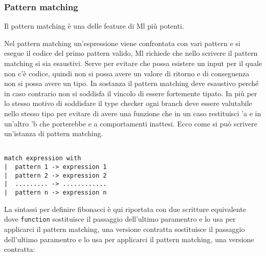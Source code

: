 \documentclass{article}
\begin{document}
\subsubsection{Pattern matching}

\hspace*{0.5cm}Il pattern matching è una delle feature di Ml più potenti.

Nel pattern matching un'espressione viene confrontata con vari pattern e si esegue il codice del primo pattern valido, Ml richiede che nello scrivere il pattern matching si sia esaustivi.
Serve per evitare che possa esistere un input per il quale non c'è codice, quindi non si possa avere un valore di ritorno e di conseguenza non si possa avere un tipo. 
In sostanza il pattern matching deve esaustivo perché in caso contrario non si soddisfa il vincolo di essere fortemente tipato.
In più per lo stesso motivo di soddisfare il type checker ogni branch deve essere valutabile nello stesso tipo per evitare di avere una funzione che in un caso restituisci 'a e in un'altro 'b che porterebbe e a comportamenti inattesi.
Ecco come si può scrivere un'istanza di pattern matching.

\begin{verbatim}

match expression with
|  pattern 1 -> expression 1
|  pattern 2 -> expression 2
|  ......... -> ............
|  pattern n -> expression n
\end{verbatim}

\vspace*{0.5cm}

\hspace*{0.5cm}La sintassi per definire fibonacci è qui riportata con due scritture equivalente dove \texttt{function} sostituisce il passaggio dell'ultimo paramentro e lo usa per applicarci il pattern matching, una versione contratta sostituisce il passaggio dell'ultimo paramentro e lo usa per applicarci il pattern matching, una versione contratta:

\vspace*{0.5cm}
\end{document}
